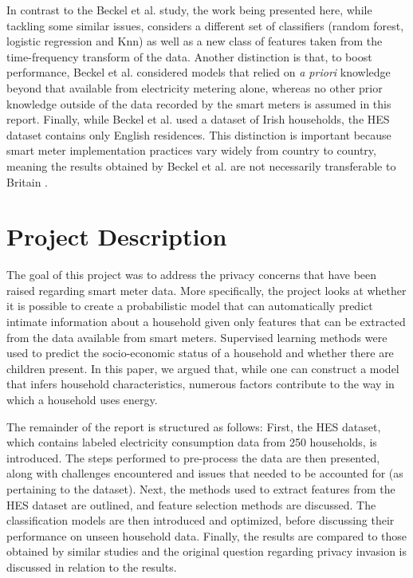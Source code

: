 In contrast to the Beckel et al. study, the work being presented here, while tackling some similar issues, considers a different set of classifiers (random forest, logistic regression and Knn) as well as a new class of features taken from the time-frequency transform of the data. Another distinction is that, to boost performance, Beckel et al. considered models that relied on \textit{a priori} knowledge beyond that available from electricity metering alone, whereas no other prior knowledge outside of the data recorded by the smart meters is assumed in this report. Finally, while Beckel et al. used a dataset of Irish households, the HES dataset contains only English residences. This distinction is important because smart meter implementation practices vary widely from country to country, meaning the results obtained by Beckel et al. are not necessarily transferable to Britain \cite{Anderson,Wilhite}. 




\section{Project Description}
The goal of this project was to address the privacy concerns that have been raised regarding smart meter data. More specifically, the project looks at whether it is possible to create a probabilistic model that can automatically predict intimate information about a household given only features that can be extracted from the data available from smart meters. Supervised learning methods were used to predict the socio-economic status of a household and whether there are children present. In this paper, we argued that, while one can construct a model that infers household characteristics, numerous factors contribute to the way in which a household uses energy.

The remainder of the report is structured as follows:
First, the HES dataset, which contains labeled electricity consumption data from 250 households, is introduced.   The steps performed to pre-process the data are then presented, along with challenges encountered and issues that needed to be accounted for (as pertaining to the dataset). Next, the methods used to extract features from the HES dataset are outlined, and feature selection methods are discussed.  The classification models are then introduced and optimized, before discussing their performance on unseen household data. Finally, the results are compared to those obtained by similar studies and the original question regarding privacy invasion is discussed in relation to the results.